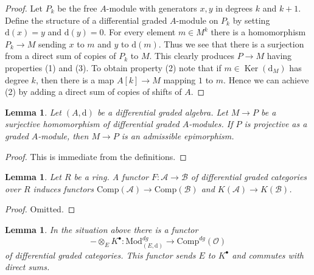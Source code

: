 \documentclass{stacks-project}
\theoremstyle{plain}
\newtheorem{lemma}[subsection]{Lemma}
\theoremstyle{definition}
\theoremstyle{remark}
\numberwithin{equation}{subsection}
\def\Ker{\mathop{\mathrm{Ker}}}
\begin{document}
\begin{proof}
Let $P_k$ be the free $A$-module with generators $x, y$ in degrees
$k$ and $k + 1$. Define the structure of a differential graded
$A$-module on $P_k$ by setting $\text{d}(x) = y$ and $\text{d}(y) = 0$.
For every element $m \in M^k$ there is a homomorphism
$P_k \to M$ sending $x$ to $m$ and $y$ to $\text{d}(m)$.
Thus we see that there is a surjection from a direct sum
of copies of $P_k$ to $M$. This clearly produces $P \to M$
having properties (1) and (3). To obtain property (2) note
that if $m \in \Ker(\text{d}_M)$ has degree $k$, then there is a map
$A[k] \to M$ mapping $1$ to $m$. Hence we can achieve (2) by adding
a direct sum of copies of shifts of $A$.
\end{proof}

\begin{lemma}
\label{lemma-target-graded-projective}
Let $(A, \text{d})$ be a differential graded algebra.
Let $M \to P$ be a surjective homomorphism of differential graded
$A$-modules. If $P$ is projective as a graded $A$-module, then
$M \to P$ is an admissible epimorphism.
\end{lemma}

\begin{proof}
This is immediate from the definitions.
\end{proof}

\begin{lemma}
\label{lemma-functorial}
Let $R$ be a ring. A functor $F : \mathcal{A} \to \mathcal{B}$
of differential graded categories over $R$ induces functors
$\text{Comp}(\mathcal{A}) \to \text{Comp}(\mathcal{B})$
and $K(\mathcal{A}) \to K(\mathcal{B})$.
\end{lemma}

\begin{proof}
Omitted.
\end{proof}

\begin{lemma}
\label{lemma-tensor-with-complex}
In the situation above there is a functor
$$
- \otimes_E K^\bullet :
\text{Mod}^{dg}_{(E, \text{d})}
\longrightarrow
\text{Comp}^{dg}(\mathcal{O})
$$
of differential graded categories. This functor sends $E$ to $K^\bullet$
and commutes with direct sums.
\end{lemma}
\end{document}
